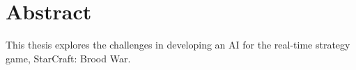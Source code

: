 \chapter{Abstract}
This thesis explores the challenges in developing an AI for the real-time strategy game, StarCraft: Brood War.
